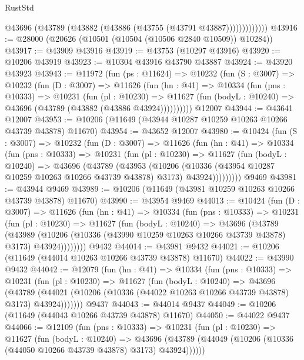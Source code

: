 \begin{lexlean}{RustStd}
\begin{coremodule}
                  @43696 (@43789 (@43882 (@43886 (@43755 (@43791 @43887)))))))))))))
@43916 := @28000 (@20626 (@10501 (@10504 (@10506 @2840 @10509)) @10284))
@43917 := @43909 @43916
@43919 := @43753 (@10297 @43916)
@43920 := @10206 @43919
@43923 := @10304 @43916 @43790 @43887
@43924 := @43920 @43923
@43943 := @11972
    (fun (ps : @11624) =>
    @10232
      (fun (S : @3007) =>
      @10232
        (fun (D : @3007) =>
        @11626
          (fun (hn : @41) =>
          @10334
            (fun (pns : @10333) =>
            @10231
              (fun (pl : @10230) =>
              @11627 (fun (bodyL : @10240) => @43696 (@43789 (@43882 (@43886 @43924))))))))))
    @12007
@43944 := @43641 @12007
@43953 := @10206 (@11649 (@43944 @10287 @10259 @10263 @10266 @43739 @43878) @11670)
@43954 := @43652 @12007
@43980 := @10424
    (fun (S : @3007) =>
    @10232
      (fun (D : @3007) =>
      @11626
        (fun (hn : @41) =>
        @10334
          (fun (pns : @10333) =>
          @10231
            (fun (pl : @10230) =>
            @11627
              (fun (bodyL : @10240) =>
              @43696
                (@43789
                  (@43953
                    (@10206
                      (@10336 (@43954 @10287 @10259 @10263 @10266 @43739 @43878) @3173)
                      @43924)))))))))
    @9469
@43981 := @43944 @9469
@43989 := @10206 (@11649 (@43981 @10259 @10263 @10266 @43739 @43878) @11670)
@43990 := @43954 @9469
@44013 := @10424
    (fun (D : @3007) =>
    @11626
      (fun (hn : @41) =>
      @10334
        (fun (pns : @10333) =>
        @10231
          (fun (pl : @10230) =>
          @11627
            (fun (bodyL : @10240) =>
            @43696
              (@43789
                (@43989
                  (@10206 (@10336 (@43990 @10259 @10263 @10266 @43739 @43878) @3173) @43924))))))))
    @9432
@44014 := @43981 @9432
@44021 := @10206 (@11649 (@44014 @10263 @10266 @43739 @43878) @11670)
@44022 := @43990 @9432
@44042 := @12079
    (fun (hn : @41) =>
    @10334
      (fun (pns : @10333) =>
      @10231
        (fun (pl : @10230) =>
        @11627
          (fun (bodyL : @10240) =>
          @43696
            (@43789
              (@44021 (@10206 (@10336 (@44022 @10263 @10266 @43739 @43878) @3173) @43924)))))))
    @9437
@44043 := @44014 @9437
@44049 := @10206 (@11649 (@44043 @10266 @43739 @43878) @11670)
@44050 := @44022 @9437
@44066 := @12109
    (fun (pns : @10333) =>
    @10231
      (fun (pl : @10230) =>
      @11627
        (fun (bodyL : @10240) =>
        @43696 (@43789 (@44049 (@10206 (@10336 (@44050 @10266 @43739 @43878) @3173) @43924))))))

\end{coremodule}
\end{lexlean}
